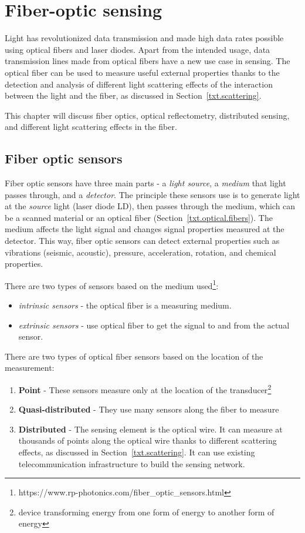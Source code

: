 \chapter{Fiber-optic sensing}\label{txt.sensing}

Light has revolutionized data transmission and made high data rates possible using optical fibers and laser diodes. Apart from the intended usage, data transmission lines made from optical fibers have a new use case in sensing. The optical fiber can be used to measure useful external properties thanks to the detection and analysis of different light scattering effects of the interaction between the light and the fiber, as discussed in Section~\ref{txt.scattering}.

This chapter will discuss fiber optics, optical reflectometry, distributed sensing, and different light scattering effects in the fiber.




\section{Fiber optic sensors}

Fiber optic sensors have three main parts - a \textit{light source}, a \textit{medium} that light passes through, and a \textit{detector}. The principle these sensors use is to generate light at the \textit{source} light (laser diode LD), then passes through the medium, which can be a scanned material or an optical fiber (Section~\ref{txt.optical.fibers}). The medium affects the light signal and changes signal properties measured at the detector. This way, fiber optic sensors can detect external properties such as vibrations (seismic, acoustic), pressure, acceleration, rotation, and chemical properties.

There are two types of sensors based on the medium used\footnote{https://www.rp-photonics.com/fiber\_optic\_sensors.html}:
\begin{itemize}
    \item \textit{intrinsic sensors} - the optical fiber is a measuring medium.
    \item \textit{extrinsic sensors} - use optical fiber to get the signal to and from the actual sensor.
\end{itemize}

There are two types of optical fiber sensors based on the location of the measurement:
\begin{enumerate}
    \item \textbf{Point} - These sensors measure only at the location of the transducer\footnote{device transforming energy from one form of energy to another form of energy}
    \item \textbf{Quasi-distributed} - They use many sensors along the fiber to measure 
    \item \textbf{Distributed} - The sensing element is the optical wire. It can measure at thousands of points along the optical wire thanks to different scattering effects, as discussed in Section~\ref{txt.scattering}. It can use existing telecommunication infrastructure to build the sensing network.
\end{enumerate}

